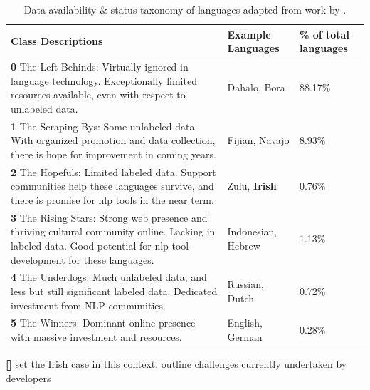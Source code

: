 \documentclass[thesis]{cluu}
\newcounter{paranum}
\newcommand{\numberedparagraph}{\par\refstepcounter{paranum}\textbf{[\theparanum] }}
\begin{document}
\begin{table}[h]
    \centering
    \begin{tabularx}{\textwidth}{|X|p{2cm}|p{1.75cm}|}
        \hline
        \textbf{Class Descriptions} & \textbf{Example Languages} & \textbf{\% of total languages}\\ \hline
        \textbf{0} The Left-Behinds: Virtually ignored in language technology. Exceptionally limited resources available, even with respect to unlabeled data. & Dahalo, Bora & 88.17\%\\ \hline
        \textbf{1} The Scraping-Bys: Some unlabeled data. With organized promotion and data collection, there is hope for improvement in coming years. & Fijian, Navajo & 8.93\%\\ \hline
        \textbf{2} The Hopefuls: Limited labeled data. Support communities help these languages survive, and there is promise for \gls{nlp} tools in the near term. & Zulu, \textbf{Irish} & 0.76\%\\ \hline
        \textbf{3} The Rising Stars: Strong web presence and thriving cultural community online. Lacking in labeled data. Good potential for \gls{nlp} tool development for these languages. & Indonesian, Hebrew & 1.13\%\\ \hline
        \textbf{4} The Underdogs: Much unlabeled data, and less but still significant labeled data. Dedicated investment from NLP communities. & Russian, Dutch & 0.72\%\\ \hline
        \textbf{5} The Winners: Dominant online presence with massive investment and resources. & English, German & 0.28\%\\ \hline
    \end{tabularx}
    \caption{Data availability \& status taxonomy of languages adapted from work by \textcite{joshiStateFateLinguistic2021}.}
    \label{tab:data_availability}
\end{table}
\numberedparagraph{set the Irish case in this context, outline challenges currently undertaken by developers}
\end{document}
